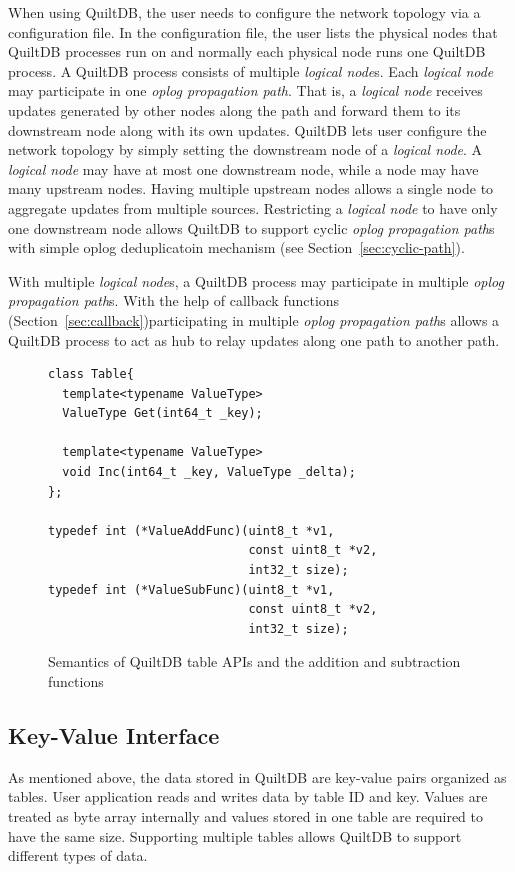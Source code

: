 \documentclass{acm_proc_article-sp}
\begin{document}
When using QuiltDB, the user needs to configure the network topology via
a configuration file. In the configuration file, the user lists the physical
nodes that QuiltDB processes run on and normally each physical node runs one
QuiltDB process. A QuiltDB process consists of multiple \emph{logical node}s.
Each \emph{logical node} may participate in one \emph{oplog propagation path}.
That is, a \emph{logical node} receives updates generated by other nodes along
the path and forward them to its downstream node along with its own updates.
QuiltDB lets user configure the network topology by simply setting the
downstream node of a \emph{logical node}. A \emph{logical node} may have at most
 one downstream node, while a node may have many upstream nodes. Having multiple
 upstream nodes allows a single node to aggregate updates from multiple sources.
 Restricting a \emph{logical node} to have only one downstream node allows
QuiltDB to support cyclic \emph{oplog propagation path}s with simple oplog
deduplicatoin mechanism (see Section~\ref{sec:cyclic-path}).

With multiple \emph{logical node}s, a QuiltDB process may participate in
multiple \emph{oplog propagation path}s. With the help of callback functions
(Section~\ref{sec:callback})participating in multiple \emph{oplog propagation path}s
allows a QuiltDB process to act as hub to relay updates along one path to
another path.

\begin{figure}[th!]
\begin{verbatim}
class Table{
  template<typename ValueType>
  ValueType Get(int64_t _key);

  template<typename ValueType>
  void Inc(int64_t _key, ValueType _delta);
};

typedef int (*ValueAddFunc)(uint8_t *v1,
                            const uint8_t *v2,
                            int32_t size);
typedef int (*ValueSubFunc)(uint8_t *v1,
                            const uint8_t *v2,
                            int32_t size);

\end{verbatim}
\caption{Semantics of QuiltDB table APIs and the addition and subtraction
  functions}
\end{figure}

\subsection{Key-Value Interface}

As mentioned above, the data stored in QuiltDB are key-value pairs organized
as tables. User application reads and writes data by table ID and key. Values
are treated as byte array internally and values stored in one table are required
 to have the same size. Supporting multiple tables allows QuiltDB to support
different types of data.
\end{document}
